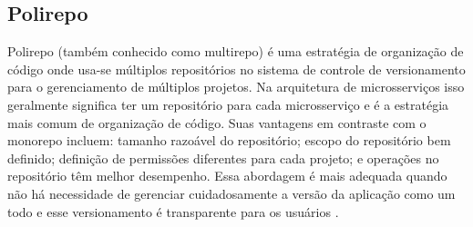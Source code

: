 
\subsection{Polirepo}
Polirepo (também conhecido como multirepo) é uma estratégia de organização de código onde usa-se múltiplos repositórios no sistema de controle de versionamento para o gerenciamento de múltiplos projetos. Na arquitetura de microsserviços isso geralmente significa ter um repositório para cada microsserviço e é a estratégia mais comum de organização de código. Suas vantagens em contraste com o monorepo incluem: tamanho razoável do repositório; escopo do repositório bem definido; definição de permissões diferentes para cada projeto; e operações no repositório têm melhor desempenho. Essa abordagem é mais adequada quando não há necessidade de gerenciar cuidadosamente a versão da aplicação como um todo e esse versionamento é transparente para os usuários \cite{monorepo-polirepo-semaphoreci}.




